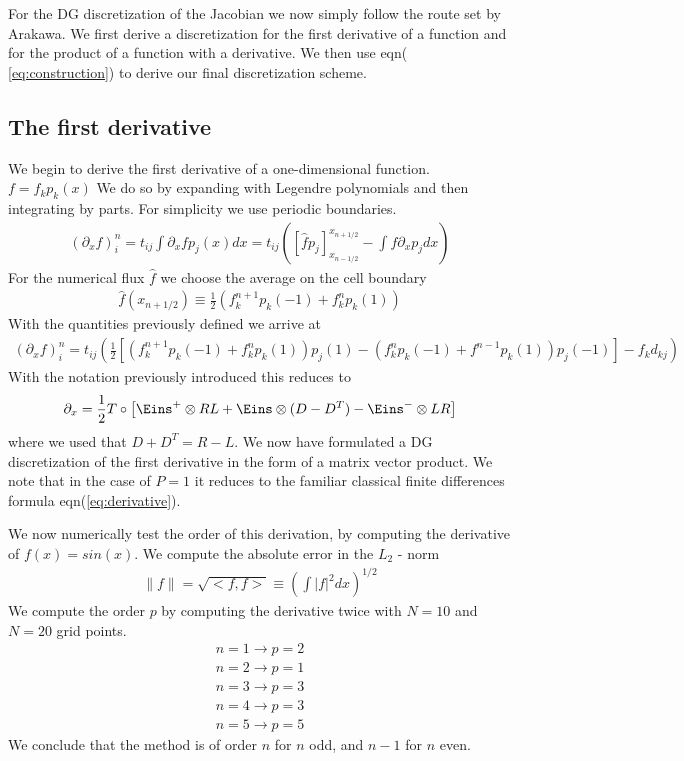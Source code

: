\documentclass[a4paper,12pt]{scrartcl}
\begin{document}
For the DG discretization of the Jacobian we now simply follow the route set by
Arakawa. We first derive a discretization for the first derivative of a function
and for the product of a function with a derivative. We then use eqn( \ref{eq:construction}) to derive our final discretization scheme. 

\subsection{ The first derivative}
We begin to derive the first derivative of a one-dimensional function.
$ f = f_kp_k(x)$
We do so
by expanding with Legendre polynomials and then integrating by parts. For 
simplicity we use periodic boundaries. 
\begin{align}
    (\partial_x f)^n_i = t_{ij}\int\partial_x f p_j(x) dx = t_{ij}\left( [\hat fp_j]_{x_{n-1/2}}^{x_{n+1/2}} - \int f \partial_x p_j dx \right)
    \label{}
\end{align}
For the numerical flux $\hat f$ we choose the average on the cell boundary
\begin{align}
    \hat f(x_{n+1/2}) \equiv \frac{1}{2}(f^{n+1}_kp_k(-1) + f^n_k p_k(1))
    \label{}
\end{align}
With the quantities previously defined we arrive at
\begin{align}
    (\partial_x f)^n_i= t_{ij}\left(  \frac{1}{2}[(f^{n+1}_kp_k(-1)+ f^n_kp_k(1))p_j(1) 
                - (f^n_kp_k(-1) + f^{n-1}p_k(1))p_j(-1)] - f_k d_{kj} \right)
    \label{}
\end{align}
With the notation previously introduced this reduces to 
\begin{align}
    \partial_x = \frac{1}{2}T\circ \left[ \Eins^+\otimes RL + \Eins \otimes (D-D^T) - \Eins^-\otimes LR\right]
    \label{}
\end{align}
where we used that $D+D^T = R-L$. We now have formulated a DG discretization of the first derivative in the form of a matrix vector product. 
We note that in the case of $P = 1$ it reduces to the familiar classical finite
differences formula eqn(\ref{eq:derivative}).

We now numerically test the order of this derivation, by computing the derivative
of $f(x) = sin(x)$. We compute the absolute error in the $L_2$ - norm 
\begin{align}
    \lVert f\rVert = \sqrt{ <f,f>} \equiv \left( \int |f|^2 dx \right)^{1/2}
    \label{eq:norm}
\end{align}
We compute the order $p$ by computing the derivative twice with $N=10$ and $N=20$ grid
points.
\begin{align*}
    n = 1 \rightarrow p = 2 \\
    n = 2 \rightarrow p = 1 \\
    n = 3 \rightarrow p = 3 \\
    n = 4 \rightarrow p = 3 \\
    n = 5 \rightarrow p = 5
\end{align*}
We conclude that the method is of order $n$ for $n$ odd, and $n-1$ for $n$ even. 
\end{document}
